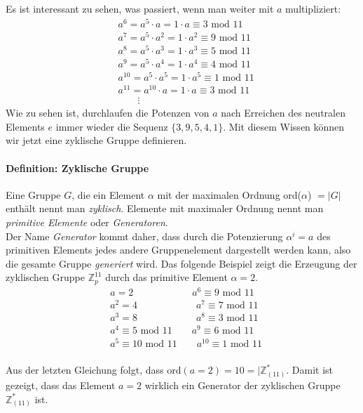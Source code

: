 Es ist interessant zu sehen, was passiert, wenn man weiter mit $a$ multipliziert:
\begin{align*}
&a^6 = a^5 \cdot a = 1 \cdot a \equiv 3 \text{ mod } 11\\
&a^7 = a^5 \cdot a^2 = 1 \cdot a^2 \equiv 9 \text{ mod } 11\\
&a^8 = a^5 \cdot a^3 = 1 \cdot a^3 \equiv 5 \text{ mod } 11\\
&a^9 = a^5 \cdot a^4 = 1 \cdot a^4 \equiv 4 \text{ mod } 11\\
&a^{10} = a^5 \cdot a^5 = 1 \cdot a^5 \equiv 1 \text{ mod } 11\\
&a^{11} = a^{10} \cdot a = 1 \cdot a \equiv 3 \text{ mod } 11\\
&\qquad \vdots
\end{align*}
Wie zu sehen ist, durchlaufen die Potenzen von $a$ nach Erreichen des neutralen Elements $e$ immer wieder die Sequenz $\{3,9,5,4,1\}$. Mit diesem Wissen können wir jetzt eine zyklische Gruppe definieren.

\paragraph{Definition: Zyklische Gruppe}
Eine Gruppe $G$, die ein Element $\alpha$ mit der maximalen Ordnung ord($\alpha$) $= |G|$ enthält nennt man \textit{zyklisch}. Elemente mit maximaler Ordnung nennt man \textit{primitive Elemente} oder \textit{Generatoren}.\\

Der Name \textit{Generator} kommt daher, dass durch die Potenzierung $\alpha^i = a$ des primitiven Elements jedes andere Gruppenelement dargestellt werden kann, also die gesamte Gruppe \textit{generiert} wird. Das folgende Beispiel zeigt die Erzeugung der zyklischen Gruppe $\mathbb{Z}^{11}_p$ durch das primitive Element $\alpha = 2$.
\begin{align*}
&a = 2 \qquad \qquad \qquad a^6 \equiv 9 \text{ mod } 11\\
&a^2 = 4 \qquad \qquad \qquad a^7 \equiv 7 \text{ mod } 11\\
&a^3 = 8 \qquad \qquad \qquad a^8 \equiv 3 \text{ mod } 11\\
&a^4 \equiv 5 \text{ mod } 11 \qquad a^9 \equiv 6 \text{ mod } 11\\
&a^5 \equiv 10 \text{ mod } 11 \qquad a^{10} \equiv 1 \text{ mod } 11\\
\end{align*}

Aus der letzten Gleichung folgt, dass ord$(a=2)=10=|\mathbb{Z}^*_(11)$. Damit ist gezeigt, dass das Element $a = 2$ wirklich ein Generator der zyklischen Gruppe $\mathbb{Z}^*_(11)$ ist.

